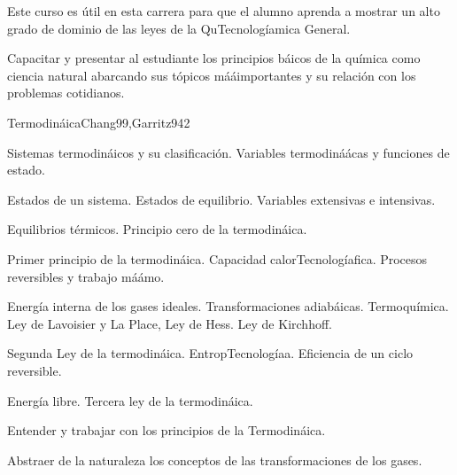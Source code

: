 \begin{syllabus}


\begin{justification}
Este curso es útil en esta carrera para que el alumno aprenda a mostrar un alto grado de dominio de las leyes de la QuTecnologíamica General.
\end{justification}

\begin{goals}
\item Capacitar y presentar al estudiante los principios báicos de la química como ciencia natural abarcando sus tópicos mááimportantes y su relación con los problemas cotidianos.
\end{goals}

\begin{outcomes}
\end{outcomes}

\begin{unit}{Termodináica}{Chang99,Garritz94}{2}
\begin{topics}
	\item Sistemas termodináicos y su clasificación. Variables termodináácas y funciones de estado.
	\item Estados de un sistema. Estados de equilibrio. Variables extensivas e intensivas.
	\item Equilibrios térmicos. Principio cero de la termodináica.
	\item Primer principio de la termodináica. Capacidad calorTecnologíafica. Procesos reversibles y trabajo máámo.
	\item Energía interna de los gases ideales. Transformaciones adiabáicas. Termoquímica. Ley de Lavoisier y La Place, Ley de Hess. Ley de Kirchhoff.
	\item Segunda Ley de la termodináica. EntropTecnologíaa. Eficiencia de un ciclo reversible.
	\item Energía libre. Tercera ley de la termodináica.
\end{topics}

\begin{unitgoals}
	\item Entender y trabajar con los principios de la Termodináica.
	\item Abstraer de la naturaleza los conceptos de las transformaciones de los gases.
\end{unitgoals}
\end{unit}


\end{syllabus}
